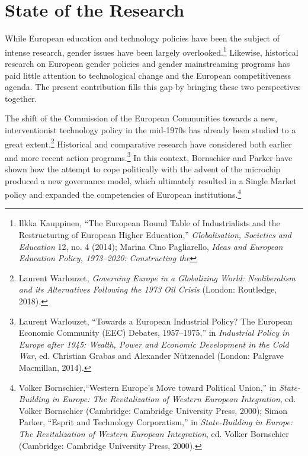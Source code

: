 \documentclass{tufte-handout}
\begin{document}
\hypertarget{state-of-the-research}{%
\section{State of the Research}\label{state-of-the-research}}

While European education and technology policies have been the subject
of intense research, gender issues have been largely
overlooked.\footnote{Ilkka Kauppinen, ``The European Round Table of
  Industrialists and the Restructuring of European Higher Education,''
  \emph{Globalisation, Societies and Education} 12, no. 4 (2014); Marina
  Cino Pagliarello, \emph{Ideas and European Education Policy,
  1973--2020: Constructing the}} Likewise, historical research on European gender policies and
gender mainstreaming programs has paid little attention to technological
change and the European competitiveness agenda. The present contribution
fills this gap by bringing these two perspectives together.

\newpage The shift of the Commission of the European Communities towards a new,
interventionist technology policy in the mid-1970s has already been
studied to a great extent.\footnote{Laurent Warlouzet, \emph{Governing
  Europe in a Globalizing World: Neoliberalism and its Alternatives
  Following the 1973 Oil Crisis} (London: Routledge, 2018).} Historical
and comparative research have considered both earlier and more recent
action programs.\footnote{Laurent Warlouzet, ``Towards a European
  Industrial Policy? The European Economic Community (EEC) Debates,
  1957--1975,'' in \emph{Industrial Policy in Europe after 1945: Wealth,
  Power and Economic Development in the Cold War}, ed. Christian Grabas
  and Alexander Nützenadel (London: Palgrave Macmillan, 2014).} In this
context, Bornschier and Parker have shown how the attempt to cope
politically with the advent of the microchip produced a new governance
model, which ultimately resulted in a Single Market policy and expanded
the competencies of European institutions.\footnote{Volker
  Bornschier,``Western Europe's Move toward Political Union,'' in
  \emph{State-Building in Europe: The Revitalization of Western European
  Integration}, ed. Volker Bornschier (Cambridge: Cambridge University
  Press, 2000); Simon Parker, ``Esprit and Technology Corporatism,'' in
  \emph{State-Building in Europe: The Revitalization of Western European
  Integration}, ed. Volker Bornschier (Cambridge: Cambridge University
  Press, 2000).}
\end{document}
